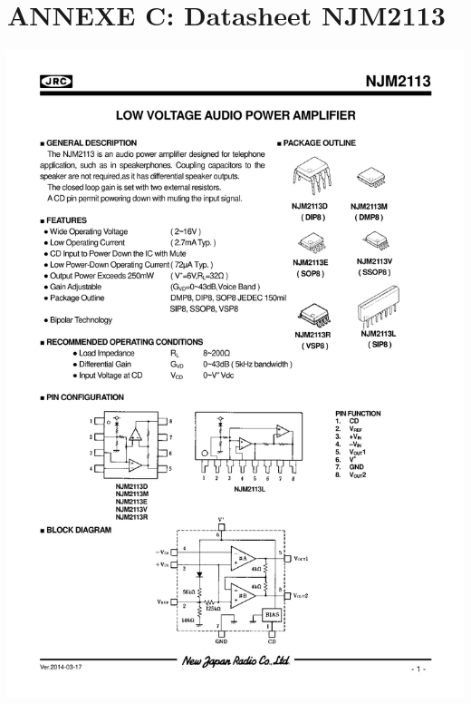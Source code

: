 \section*{ANNEXE C: Datasheet NJM2113}
\vspace{-0.1cm}
\label{DatasheetNJM2113}
\begin{center}
\includegraphics[scale=0.8, page=1]{NJM2113_E.pdf}
\newpage

\end{center}
